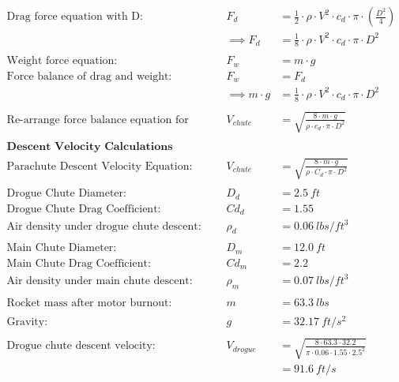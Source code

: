 \documentclass{article}
\begin{document}
\begin{align*}
		\text{Drag force equation with D:}& &F_{d} &= \frac{1}{2} \cdot \rho \cdot V^{2} \cdot c_{d} \cdot \pi \cdot \left( \frac{D^{2}}{4} \right) \\
		& &\implies F_{d} &= \frac{1}{8} \cdot \rho \cdot V^{2} \cdot c_{d} \cdot \pi \cdot D^{2} \\ \\
		\text{Weight force equation:}& &F_{w} &= m \cdot g \\
		\text{Force balance of drag and weight:}& &F_{w} &= F_{d} \\
		&& \implies m \cdot g&= \frac{1}{8} \cdot \rho \cdot V^{2} \cdot c_{d} \cdot \pi \cdot D^{2} \tag{eqn. 11} \\ \\
		\text{Re-arrange force balance equation for solution:}& & V_{chute} &= \sqrt{\frac{8 \cdot m \cdot g}{\rho \cdot c_{d} \cdot \pi \cdot D^{2}}} \tag{eqn. 12} \\ \\
		\textbf{Descent Velocity Calculations} \\
		\text{Parachute Descent Velocity Equation:}& & V_{chute} &= \sqrt{\frac{8 \cdot m \cdot g}{\rho \cdot C_{d} \cdot \pi \cdot D^{2}}} \tag{eqn. 12} \\ \\
		\text{Drogue Chute Diameter:}& &D_{d} &= \SI{2.5}{ft} \\
		\text{Drogue Chute Drag Coefficient:}& &Cd_{d} &= \SI{1.55}{} \\
		\text{Air density under drogue chute descent:}& &\rho_{d} &= \SI{0.06}{lbs/ft^3} \\ \\
		\text{Main Chute Diameter:}& &D_{m} &= \SI{12.0}{ft} \\
		\text{Main Chute Drag Coefficient:}& &Cd_{m} &= \SI{2.2}{} \\
		\text{Air density under main chute descent:}& &\rho_{m} &= \SI{0.07}{lbs/ft^3} \\ \\
		\text{Rocket mass after motor burnout:}& &m &= \SI{63.3}{lbs} \\ \\
		\text{Gravity:}& &g &= \SI{32.17}{ft/s^2} \\ \\
		\text{Drogue chute descent velocity:}& &V_{drogue} &= \sqrt{\frac{8 \cdot 63.3 \cdot 32.2}{\pi \cdot 0.06 \cdot 1.55 \cdot 2.5^{2}}} \\
		&& &= \SI{91.6}{ft/s} \\ \\

\end{align*}
\end{document}
